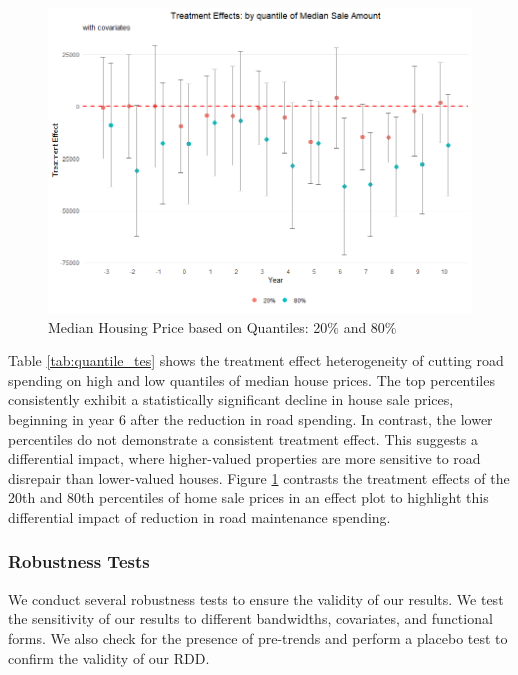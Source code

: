 \begin{figure}[htbp]
    \centering
    \includegraphics[width=\textwidth,keepaspectratio]{images/tes_qte_covs.png}
    \caption{Median Housing Price based on Quantiles: 20\% and 80\%}
    \label{fig:tes_qte_covs}
\end{figure}

Table \ref{tab:quantile_tes} shows the treatment effect heterogeneity of cutting road spending on high and low quantiles of median house prices. The top percentiles consistently exhibit a statistically significant decline in house sale prices, beginning in year 6 after the reduction in road spending. In contrast, the lower percentiles do not demonstrate a consistent treatment effect. This suggests a differential impact, where higher-valued properties are more sensitive to road disrepair than lower-valued houses. Figure \ref{fig:tes_qte_covs} contrasts the treatment effects of the 20th and 80th percentiles of home sale prices in an effect plot to highlight this differential impact of reduction in road maintenance spending.

\subsubsection{Robustness Tests} We conduct several robustness tests to ensure the validity of our results. We test the sensitivity of our results to different bandwidths, covariates, and functional forms. We also check for the presence of pre-trends and perform a placebo test to confirm the validity of our RDD.

\vskip 0.5cm

